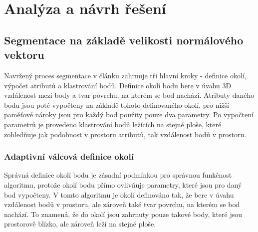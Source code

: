 \documentclass[11pt,twoside,a4paper]{book}
\begin{document}
\chapter{Analýza a návrh řešení}

\section{Segmentace na základě velikosti normálového vektoru}

Navržený proces segmentace v článku \cite{Seg01} zahrnuje tři hlavní kroky - definice okolí, výpočet atributů a klastrování bodů. Definice okolí bodu bere v úvahu 3D vzdálenost mezi body a tvar povrchu, na kterém se bod nachází. Atributy daného bodu jsou poté vypočteny na základě tohoto definovaného okolí, pro nižší paměťové nároky jsou pro každý bod použity pouze dva parametry. Po vypočtení parametrů je provedeno klastrování bodů ležících na stejné ploše, které zohledňuje jak podobnost v prostoru atributů, tak vzdálenost bodů v prostoru.

\subsection{Adaptivní válcová definice okolí} 
\label{sub:def-okoli}

Správná definice okolí bodu je zásadní podmínkou pro správnou funkčnost algoritmu, protože okolí bodu přímo ovlivňuje parametry, které jsou pro daný bod vypočteny. V tomto algoritmu je okolí definováno tak, že bere v úvahu vzdálenost bodů v prostoru, ale zároveň také tvar povrchu, na kterém se bod nachází. To znamená, že do okolí jsou zahrnuty pouze takové body, které jsou prostorově blízko, ale zároveň leží na stejné ploše.
\end{document}
